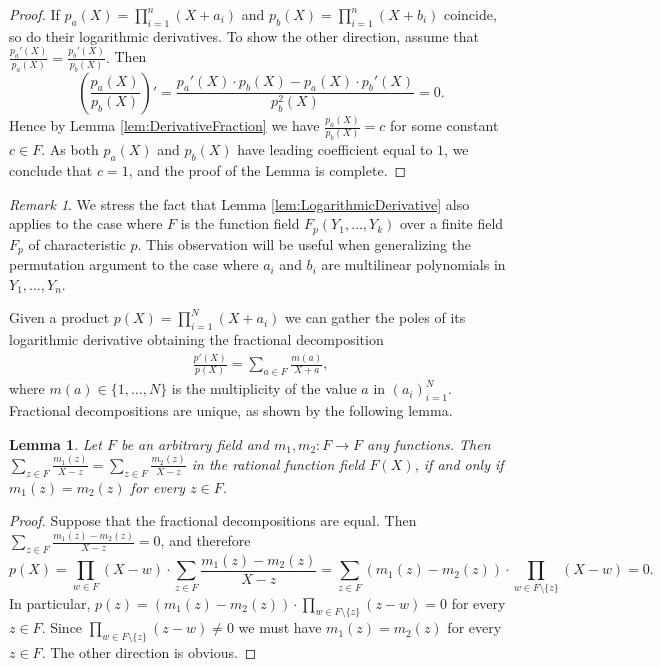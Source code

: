 \documentclass[11pt]{article}
\newtheorem{lem}[]{Lemma}
\theoremstyle{definition}
\theoremstyle{remark}
\newtheorem{rem}[thm]{Remark}
\begin{document}
\begin{proof}
If  $p_a(X) = \prod_{i=1}^n \left(X + a_i\right)$ and $p_b(X) = \prod_{i=1}^n \left(X + b_i\right)$
coincide, so do their logarithmic derivatives.
To show the other direction, assume that 
$
\frac{p_a'(X)}{p_a(X)}  = \frac{p_b'(X)}{p_b(X)}.
$
Then 
\[
\left(\frac{p_a(X)}{p_b(X)}\right)'  = \frac{p_a'(X)\cdot p_b(X) - p_a(X)\cdot  p_b'(X)} {p_b^2(X)} = 0.
\]
Hence by Lemma \ref{lem:DerivativeFraction} we have $\frac{p_a(X)}{p_b(X)} = c$ for some constant  $c \in F$.
As both $p_a(X)$ and $p_b(X)$ have leading coefficient equal to $1$, we conclude that $c =1$, and the proof of the Lemma is complete.
\end{proof}
\begin{rem}
\label{rem:LogarithmicDerivativeFunctionField}
We stress the fact that Lemma \ref{lem:LogarithmicDerivative} also applies to the case where $F$  is the function field $F_p(Y_1,\ldots, Y_k)$ over a finite field $F_p$ of characteristic $p$.
This observation will be useful when generalizing the permutation argument to the case where $a_i$ and $b_i$ are multilinear polynomials in $Y_1, \ldots, Y_n$.
\end{rem}

Given a product $p(X)=\prod_{i=1}^N (X + a_i)$ we can gather the poles of its logarithmic derivative obtaining the fractional decomposition  
\begin{align*}
\frac{p'(X)}{p(X)} = \sum_{a\in F} \frac{m(a)}{X + a},
\end{align*}
where $m(a)\in \{1,\ldots, N\}$ is the multiplicity of the value $a$ in $(a_i)_{i=1}^N$.
Fractional decompositions are unique, as shown by the following lemma.
\begin{lem}
\label{lem:UniqueFractionalRep}
Let $F$ be an arbitrary field and $m_1, m_2: F\rightarrow F$ any functions.
Then
$
\sum_{z\in F} \frac{m_1(z)}{X - z} = \sum_{z\in F} \frac{m_2(z)}{X - z}
$
in the rational function field $F(X)$, if and only if $m_1(z)=m_2(z)$ for every $z\in F$.
\end{lem}
\begin{proof}
Suppose that the fractional decompositions are equal.  
Then $\sum_{z\in F} \frac{m_1(z)-m_2(z)}{X - z} = 0$, and therefore
\[
p(X) = \prod_{w\in F} (X - w)\cdot\sum_{z\in F} \frac{m_1(z)-m_2(z)}{X - z} = \sum_{z\in F} (m_1(z)-m_2(z))\cdot \prod_{w\in F\setminus\{z\}} (X - w) = 0.
\]
In particular,
$
p(z) = (m_1(z) - m_2(z)) \cdot  \prod_{w\in F\setminus\{z\}} (z - w)= 0
$
for every $z\in F$.
Since   $\prod_{w\in F\setminus\{z\}} (z - w) \neq 0$ we must have $m_1(z)  = m_2(z)$ for every $z\in F$. 
The other direction is obvious.
\end{proof}
\end{document}
